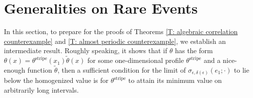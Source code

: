 \documentclass[10pt,a4paper]{amsart}
\newtheorem{remark}{Remark}
\begin{document}
%
%	
	
\section{Generalities on Rare Events}

In this section, to prepare for the proofs of Theorems \ref{T: algebraic correlation counterexample} and \ref{T: almost periodic counterexample}, we establish an intermediate result.  Roughly speaking, it shows that if $\theta$ has the form $\theta(x) = \theta^{\text{stripe}}(x_{1}) \tilde{\theta}(x)$ for some one-dimensional profile $\theta^{\text{stripe}}$ and a nice-enough function $\tilde{\theta}$, then a sufficient condition for the limit of $\sigma_{\epsilon,\delta(\epsilon)} ( e_1 ; \cdot ) $ to lie below the homogenized value is for $\theta^{\text{stripe}}$ to attain its minimum value on arbitrarily long intervals. 
\end{document}

